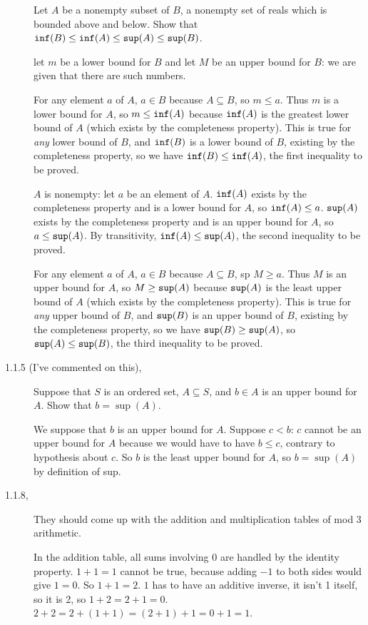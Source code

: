 \documentclass[12pt]{article}
\begin{document}
\begin{description}
Let $A$ be a nonempty subset of $B$, a nonempty set of reals which is bounded above and below.   Show that
${\tt inf}(B) \leq {\tt inf}(A) \leq {\tt sup}(A) \leq {\tt sup}(B)$.

let $m$ be a lower bound for $B$ and let $M$ be an upper bound for $B$:  we are given that there are such numbers.

For any element $a$ of $A$, $a \in B$ because $A \subseteq B$, so $m \leq a$.  Thus $m$ is a lower bound for $A$, so $m \leq {\tt inf}(A)$ because
${\tt inf}(A)$ is the greatest lower bound of $A$ (which exists by the completeness property).  This is true for {\em any\/} lower bound of $B$, and ${\tt inf}(B)$ is a lower bound of $B$, existing by the completeness property, so
we have ${\tt inf}(B) \leq {\tt inf}(A)$, the first inequality to be proved.

$A$ is nonempty:  let $a$ be an element of $A$.  ${\tt inf}(A)$ exists by the completeness property and is a lower bound for $A$, so
${\tt inf}(A)\leq a$.   ${\tt sup}(A)$ exists by the completeness property and is an upper bound for $A$, so
$a \leq {\tt sup}(A)$.  By transitivity, ${\tt inf}(A) \leq {\tt sup}(A)$, the second inequality to be proved.

For any element $a$ of $A$, $a \in B$ because $A \subseteq B$, sp $M \geq a$.  Thus $M$ is an upper bound for $A$, so $M \geq {\tt sup}(A)$ because
${\tt sup}(A)$ is the least upper bound of $A$ (which exists by the completeness property).  This is true for {\em any\/} upper bound of $B$, and ${\tt sup}(B)$ is an upper bound of $B$, existing by the completeness property, so
we have ${\tt sup}(B) \geq {\tt sup}(A)$, so ${\tt sup}(A) \leq {\tt sup}(B)$, the third inequality to be proved.

\item[ 1.1.5 (I've commented on this),]

Suppose that $S$ is an ordered set, $A \subseteq S$, and $b \in A$ is an upper bound for $A$.  Show that $b = \sup(A)$.

We suppose that $b$ is an upper bound for $A$.  Suppose $c < b$:  $c$ cannot be an upper bound for $A$ because we would have to have
$b \leq c$, contrary to hypothesis about $c$.  So $b$ is the least upper bound for $A$, so $b = \sup(A)$ by definition of sup.

\item[ 1.1.8,]  They should come up with the addition and multiplication tables of mod 3 arithmetic.

In the addition table, all sums involving 0 are handled by the identity property.  $1+1=1$ cannot be true, because adding $-1$ to both sides
would give $1=0$.  So $1+1=2$.  $1$ has to have an additive inverse, it isn't 1 itself, so it is 2, so $1+2=2+1=0$.  $2+2 = 2 + (1+1) = (2+1)+1 = 0+1 = 1$.


\end{description}
\end{document}
